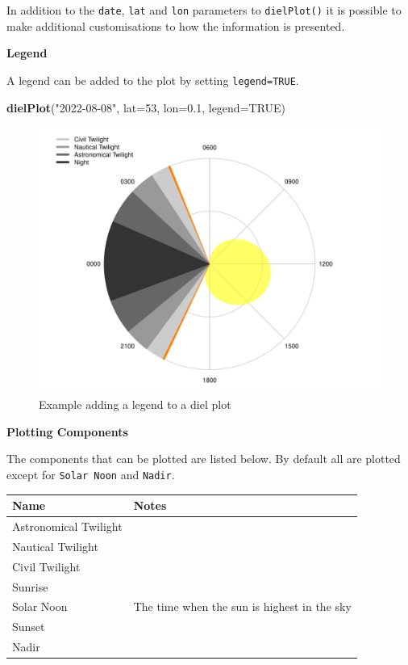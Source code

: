 \documentclass[
]{book}
\newenvironment{Shaded}{\begin{snugshade}}{\end{snugshade}}
\newcommand{\AttributeTok}[1]{\textcolor[rgb]{0.13,0.29,0.53}{#1}}
\newcommand{\ConstantTok}[1]{\textcolor[rgb]{0.56,0.35,0.01}{#1}}
\newcommand{\DecValTok}[1]{\textcolor[rgb]{0.00,0.00,0.81}{#1}}
\newcommand{\FloatTok}[1]{\textcolor[rgb]{0.00,0.00,0.81}{#1}}
\newcommand{\FunctionTok}[1]{\textcolor[rgb]{0.13,0.29,0.53}{\textbf{#1}}}
\newcommand{\NormalTok}[1]{#1}
\newcommand{\StringTok}[1]{\textcolor[rgb]{0.31,0.60,0.02}{#1}}
\begin{document}
In addition to the \texttt{date}, \texttt{lat} and \texttt{lon} parameters to \texttt{dielPlot()} it is possible to make additional customisations to how the information is presented.

\textbf{Legend}

A legend can be added to the plot by setting \texttt{legend=TRUE}.

\begin{Shaded}
\begin{Highlighting}[]
\FunctionTok{dielPlot}\NormalTok{(}\StringTok{"2022{-}08{-}08"}\NormalTok{, }\AttributeTok{lat=}\DecValTok{53}\NormalTok{, }\AttributeTok{lon=}\FloatTok{0.1}\NormalTok{, }\AttributeTok{legend=}\ConstantTok{TRUE}\NormalTok{)}
\end{Highlighting}
\end{Shaded}

\begin{figure}

{\centering \includegraphics[width=0.9\linewidth]{_main_files/figure-latex/diel-plot-legend-1} 

}

\caption{Example adding a legend to a diel plot}\label{fig:diel-plot-legend}
\end{figure}

\textbf{Plotting Components}

The components that can be plotted are listed below. By default all are plotted except for \texttt{Solar\ Noon} and \texttt{Nadir}.

\begin{longtable}[]{@{}ll@{}}
\toprule\noalign{}
Name & Notes \\
\midrule\noalign{}
\endhead
\bottomrule\noalign{}
\endlastfoot
Astronomical Twilight & \\
Nautical Twilight & \\
Civil Twilight & \\
Sunrise & \\
Solar Noon & The time when the sun is highest in the sky \\
Sunset & \\
Nadir & \\
\end{longtable}
\end{document}
